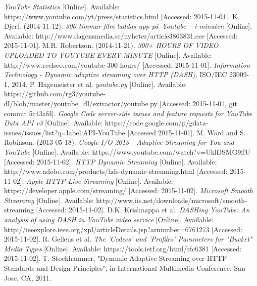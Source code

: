 \begin{thebibliography}{5}
    \footnotesize
        \textit{YouTube Statistics}
        [Online].
        Available:
        https://www.youtube.com/yt/press/statistics.html
        [Accessed: 2015-11-01].
        K. Djerf.
        (2014-11-12).
        \textit{300 timmar film laddas upp p\aa\  Youtube – i minuten}
        [Online].
        Available:
        http://www.dagensmedia.se/nyheter/article3863831.ece
        [Accessed: 2015-11-01].
        M.R. Robertson.
        (2014-11-21).
        \textit{300+ HOURS OF VIDEO UPLOADED TO YOUTUBE EVERY MINUTE}
        [Online].
        Available:
        http://www.reelseo.com/youtube-300-hours/
        [Accessed: 2015-11-01].
        \textit{Information Technology - Dynamic adaptive streaming over HTTP (DASH)},
        ISO/IEC 23009-1, 2014.
        P. Hagemeister et al.
        \textit{youtube.py}
        [Online].
        Available:
        https://github.com/rg3/youtube-dl/blob/master/youtube\_dl/extractor/youtube.py
        [Accessed: 2015-11-01, git commit 5c43afd].
        \textit{Google Code server-side issues and feature requests for YouTube Data API v3}
        [Online].
        Available:
        https://code.google.com/p/gdata-issues/issues/list?q=label:API-YouTube
        [Accessed 2015-11-01].
        M. Ward and S. Robinson.
        (2013-05-18).
        \textit{Google I/O 2013 - Adaptive Streaming for You and YouTube}
        [Online].
        Available:
        https://www.youtube.com/watch?v=UklDSMG9ffU
        [Accessed: 2015-11-02].
        \textit{HTTP Dynamic Streaming}
        [Online].
        Available:
        http://www.adobe.com/products/hds-dynamic-streaming.html
        [Accessed: 2015-11-02].
        \textit{Apple HTTP Live Streaming}
        [Online].
        Available:
        https://developer.apple.com/streaming/
        [Accessed: 2015-11-02].
        \textit{Microsoft Smooth Streaming}
        [Online].
        Available:
        http://www.iis.net/downloads/microsoft/smooth-streaming
        [Accessed: 2015-11-02].
        D.K. Krishnappa et al.
        \textit{DASHing YouTube: An analysis of using DASH in YouTube video service}
        [Online].
        Available:
        http://ieeexplore.ieee.org/xpl/articleDetails.jsp?arnumber=6761273
        [Accessed: 2015-11-02].
        R. Gellens et al.
        \textit{The 'Codecs' and 'Profiles' Parameters for "Bucket" Media Types}
        [Online].
        Available:
        https://tools.ietf.org/html/rfc6381
        [Accessed: 2015-11-02].
        T. Stockhammer,
        "Dynamic Adaptive Streaming over HTTP – Standards and Design Principles",
        in International Multimedia Conference,
        San Jose, CA,
        2011.
\end{thebibliography}
